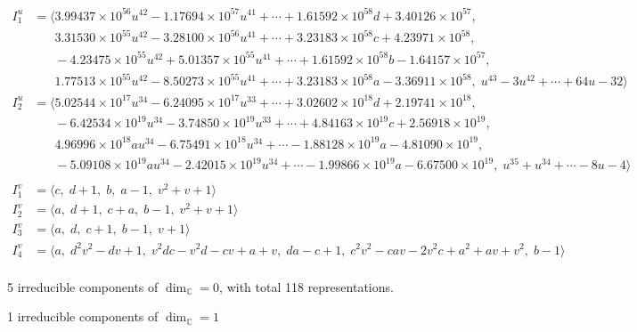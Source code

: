 \documentclass[1p]{elsarticle_modified}
\theoremstyle{definition}
\begin{document}
\begin{align*}
I^u_{1}&=\langle 
3.99437\times10^{56} u^{42}-1.17694\times10^{57} u^{41}+\cdots+1.61592\times10^{58} d+3.40126\times10^{57},\\
\phantom{I^u_{1}}&\phantom{= \langle  }3.31530\times10^{55} u^{42}-3.28100\times10^{56} u^{41}+\cdots+3.23183\times10^{58} c+4.23971\times10^{58},\\
\phantom{I^u_{1}}&\phantom{= \langle  }-4.23475\times10^{55} u^{42}+5.01357\times10^{55} u^{41}+\cdots+1.61592\times10^{58} b-1.64157\times10^{57},\\
\phantom{I^u_{1}}&\phantom{= \langle  }1.77513\times10^{55} u^{42}-8.50273\times10^{55} u^{41}+\cdots+3.23183\times10^{58} a-3.36911\times10^{58},\;u^{43}-3 u^{42}+\cdots+64 u-32\rangle \\
I^u_{2}&=\langle 
5.02544\times10^{17} u^{34}-6.24095\times10^{17} u^{33}+\cdots+3.02602\times10^{18} d+2.19741\times10^{18},\\
\phantom{I^u_{2}}&\phantom{= \langle  }-6.42534\times10^{19} u^{34}-3.74850\times10^{19} u^{33}+\cdots+4.84163\times10^{19} c+2.56918\times10^{19},\\
\phantom{I^u_{2}}&\phantom{= \langle  }4.96996\times10^{18} a u^{34}-6.75491\times10^{18} u^{34}+\cdots-1.88128\times10^{19} a-4.81090\times10^{19},\\
\phantom{I^u_{2}}&\phantom{= \langle  }-5.09108\times10^{19} a u^{34}-2.42015\times10^{19} u^{34}+\cdots-1.99866\times10^{19} a-6.67500\times10^{19},\;u^{35}+u^{34}+\cdots-8 u-4\rangle \\
\\
I^v_{1}&=\langle 
c,\;d+1,\;b,\;a-1,\;v^2+v+1\rangle \\
I^v_{2}&=\langle 
a,\;d+1,\;c+a,\;b-1,\;v^2+v+1\rangle \\
I^v_{3}&=\langle 
a,\;d,\;c+1,\;b-1,\;v+1\rangle \\
I^v_{4}&=\langle 
a,\;d^2 v^2- d v+1,\;v^2 d c- v^2 d- c v+a+v,\;d a- c+1,\;c^2 v^2- c a v-2 v^2 c+a^2+a v+v^2,\;b-1\rangle \\
\end{align*}
\raggedright * 5 irreducible components of $\dim_{\mathbb{C}}=0$, with total 118 representations.\\
\raggedright * 1 irreducible components of $\dim_{\mathbb{C}}=1$ \\
\newpage
\renewcommand{\arraystretch}{1}
\end{document}
